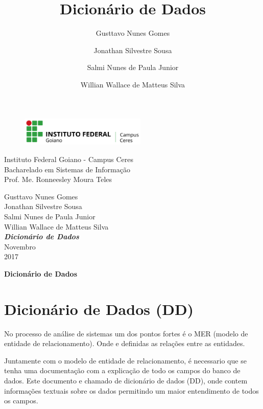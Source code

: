 \documentclass[12pt,a4paper]{article}
\title{Dicionário de Dados}
\author{Gusttavo Nunes Gomes\and Jonathan Silvestre Sousa \and Salmi Nunes de Paula Junior\and Willian Wallace de Matteus Silva}
\begin{document}
\begin{titlepage}
\begin{center}
\begin{figure}[htb]
                
                \label{figura:LogoIF}
        
                \centering
                \includegraphics[width=6cm]{recursos/imagens/logo.png} 
\end{figure}
Instituto Federal Goiano - Campus Ceres\\
Bacharelado em Sistemas de Informação\\
Prof. Me. Ronneesley Moura Teles\\\vspace{1cm}

Gusttavo Nunes Gomes\\
Jonathan Silvestre Sousa \\
Salmi Nunes de Paula Junior\\
Willian Wallace de Matteus Silva\\
\vspace{6.0cm}
\textit{\textbf{\Large{Dicionário de Dados}}}\\\vspace{11cm}
Novembro\\
2017\\
\end{center}
\end{titlepage}
\tableofcontents
\newpage
\begin{center}
\textbf{\Large{Dicionário de Dados}}\\\vspace{0.5cm}
\end{center}
\section{Dicionário de Dados (DD)}


No processo de análise de sistemas um dos pontos fortes é o MER (modelo de entidade de relacionamento). Onde e definidas as relações entre as entidades.

Juntamente com o modelo de entidade de relacionamento, é necessario que se tenha uma documentação com a explicação de todo os campos do banco de dados. Este documento e chamado de dicionário de dados (DD), onde contem informações textuais sobre os dados permitindo um maior entendimento de todos os campos.
\end{document}
